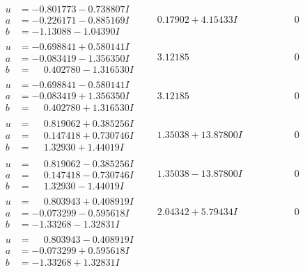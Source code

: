 \documentclass[1p]{elsarticle_modified}
\theoremstyle{definition}
\begin{document}
$$\begin{array}{c|c|c}
\begin{aligned}
u &= -0.801773 - 0.738807 I \\
a &= -0.226171 - 0.885169 I \\
b &= -1.13088 - 1.04390 I\end{aligned}
 & \phantom{-}0.17902 + 4.15433 I & \phantom{-0.000000 } 0 \\ \hline\begin{aligned}
u &= -0.698841 + 0.580141 I \\
a &= -0.083419 - 1.356350 I \\
b &= \phantom{-}0.402780 - 1.316530 I\end{aligned}
 & \phantom{-}3.12185\phantom{ +0.000000I} & \phantom{-0.000000 } 0 \\ \hline\begin{aligned}
u &= -0.698841 - 0.580141 I \\
a &= -0.083419 + 1.356350 I \\
b &= \phantom{-}0.402780 + 1.316530 I\end{aligned}
 & \phantom{-}3.12185\phantom{ +0.000000I} & \phantom{-0.000000 } 0 \\ \hline\begin{aligned}
u &= \phantom{-}0.819062 + 0.385256 I \\
a &= \phantom{-}0.147418 + 0.730746 I \\
b &= \phantom{-}1.32930 + 1.44019 I\end{aligned}
 & \phantom{-}1.35038 + 13.87800 I & \phantom{-0.000000 } 0 \\ \hline\begin{aligned}
u &= \phantom{-}0.819062 - 0.385256 I \\
a &= \phantom{-}0.147418 - 0.730746 I \\
b &= \phantom{-}1.32930 - 1.44019 I\end{aligned}
 & \phantom{-}1.35038 - 13.87800 I & \phantom{-0.000000 } 0 \\ \hline\begin{aligned}
u &= \phantom{-}0.803943 + 0.408919 I \\
a &= -0.073299 - 0.595618 I \\
b &= -1.33268 - 1.32831 I\end{aligned}
 & \phantom{-}2.04342 + 5.79434 I & \phantom{-0.000000 } 0 \\ \hline\begin{aligned}
u &= \phantom{-}0.803943 - 0.408919 I \\
a &= -0.073299 + 0.595618 I \\
b &= -1.33268 + 1.32831 I\end{aligned}

\end{array}$$
\end{document}
